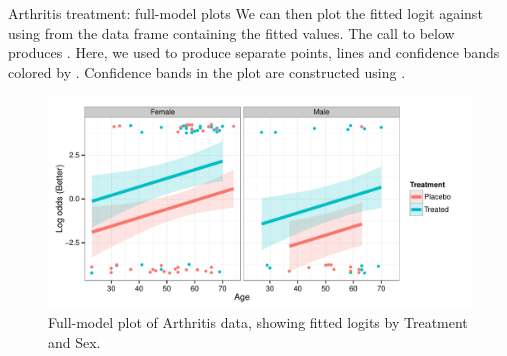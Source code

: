 \documentclass[11pt]{book}
\renewenvironment{knitrout}{\small\renewcommand{\baselinestretch}{.85}}{} %
\begin{document}
\begin{Example}{Arthritis treatment: full-model plots}
We can then plot the fitted logit against  using 
from the data frame containing the fitted values.  The call to 
below produces .  Here, we used 
to produce separate points, lines and confidence bands colored by .
Confidence bands in the plot are constructed using .
\begin{knitrout}
\color{fgcolor}\begin{kframe}
\begin{alltt}
 \hlstd{(}   \hlopt{+}
  \hlstd{(} \hlstd{=} \hlstd{)} \hlopt{+} \hlstd{()} \hlopt{+}
  \hlstd{(}\hlstd{(}  \hlopt{-}  \hlopt{*} 
                    \hlopt{+}  \hlopt{*} 
                     \hlstd{=} \hlstd{,}
               \hlstd{=} \hlstd{)} \hlopt{+}
  \hlstd{(} \hlstd{=} \hlstd{,}  \hlstd{=} \hlstd{)} \hlopt{+}
  \hlstd{(}\hlstd{(}
             \hlstd{=}\hlstd{(}\hlstd{=}\hlstd{,} \hlstd{=}\hlstd{))} \hlopt{+}
  \hlstd{(}\hlopt{~} 
\end{alltt}
\end{kframe}\begin{figure}[!htbp]


\centerline{\includegraphics[width=.8\textwidth,clip]{ch07/fig/arth-full1} }

\caption[Full-model plot of Arthritis data, showing fitted logits by Treatment and Sex]{Full-model plot of Arthritis data, showing fitted logits by Treatment and Sex.\label{fig:arth-full1}}
\end{figure}



\end{knitrout}
\end{Example}
\end{document}
